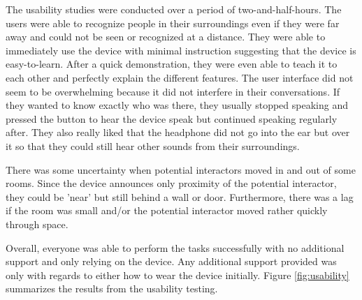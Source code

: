 The usability studies were conducted over a period of two-and-half-hours. The users were able to recognize people in their surroundings even if they were far away and could not be seen or recognized at a distance. They were able to immediately use the device with minimal instruction suggesting that the device is easy-to-learn. After a quick demonstration,  they were even able to teach it to each other and perfectly explain the different features. The user interface did not seem to be overwhelming because it did not interfere in their conversations. If they wanted to know exactly who was there, they usually stopped speaking and pressed the button to hear the device speak but continued speaking regularly after. They also really liked that the headphone did not go into the ear but over it so that they could still hear other sounds from their surroundings. 

There was some uncertainty when potential interactors moved in and out of some rooms. Since the device announces only proximity of the potential interactor, they could be 'near' but still behind a wall or door. Furthermore, there was a lag if the room was small and/or the potential interactor moved rather quickly through space. 

Overall, everyone was able to perform the tasks successfully with no additional support and only relying on the device. Any additional support provided was only with regards to either how to wear the device initially. 
Figure \ref{fig:usability} summarizes the results from the usability testing.

